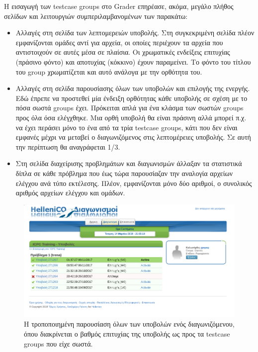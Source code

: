 \documentclass[diploma]{softlab-thesis}
\begin{document}
\bigskip

Η εισαγωγή των testcase groups στο Grader επηρέασε, ακόμα, μεγάλο πλήθος σελίδων
και λειτουργιών συμπεριλαμβανομένων των παρακάτω:

\begin{itemize}
    \item Αλλαγές στη σελίδα των λεπτομερειών υποβολής. Στη συγκεκριμένη
      σελίδα πλέον εμφανίζονται ομάδες αντί για αρχεία, οι οποίες περιέχουν
      τα αρχεία που αντιστοιχούν σε αυτές μέσα σε πλαίσια. Οι χρωματικές ενδείξεις
      επιτυχίας (πράσινο φόντο) και αποτυχίας (κόκκινο) έχουν παραμείνει. Το φόντο
      του τίτλου του group χρωματίζεται και αυτό ανάλογα με την ορθότητα του.

    \item Αλλαγές στη σελίδα παρουσίασης όλων των υποβολών και επιλογής της
      ενεργής.  Εδώ έπρεπε να προστεθεί μία ένδειξη ορθότητας κάθε υποβολής σε
      σχέση με το πόσα σωστά groups έχει. Πρόκειται απλά για ένα κλάσμα των
      σωστών groups προς όλα όσα ελέγχθηκε. Μια ορθή υποβολή θα είναι πράσινη
      αλλά μπορεί π.χ. να έχει περάσει μόνο το ένα από τα τρία testcase groups,
      κάτι που δεν είναι εμφανές μέχρι να μεταβεί ο διαγωνιζόμενος στις
      λεπτομέρειες υποβολής. Σε αυτή την περίπτωση θα αναγράφεται 1/3.

    \item Στη σελίδα διαχείρισης προβλημάτων και διαγωνισμών άλλαξαν τα στατιστικά
      δίπλα σε κάθε πρόβλημα που έως τώρα παρουσίαζαν την αναλογία αρχείων ελέγχου
      ανά τύπο εκτέλεσης. Πλέον, εμφανίζονται μόνο δύο αριθμοί, ο συνολικός αριθμός
      αρχείων ελέγχου και ομάδων.

\end{itemize}

\begin{figure}
  \centering
  \includegraphics[scale=0.5,trim=4 4 4 4,clip]{Figures/allsubmissions.png}
  \caption[Νέα σελίδα εμφάνισης υποβολών]{Η τροποποιημένη παρουσίαση όλων των
  υποβολών ενός διαγωνιζόμενου, όπου διακρίνεται ο βαθμός επιτυχίας της υποβολής
  ως προς τα testcase groups που είχε σωστά.}
\end{figure}
\end{document}
